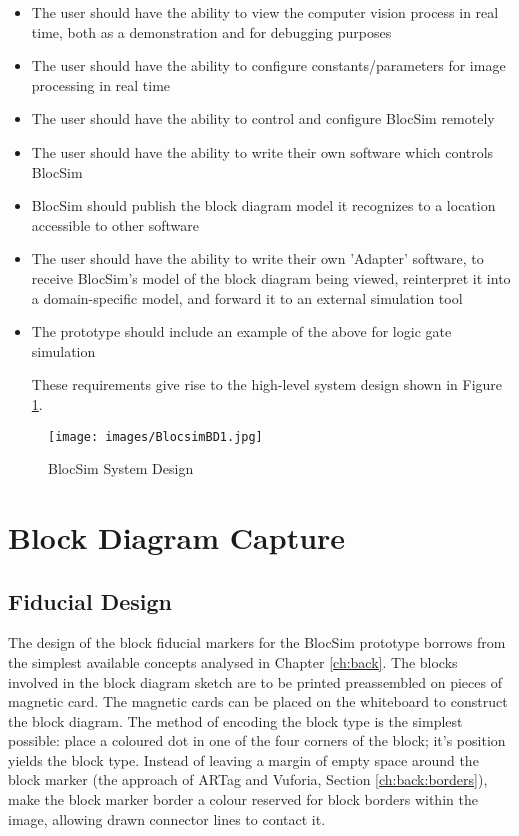 \begin{itemize}
\item The user should have the ability to view the computer vision process in real time, both as a demonstration and for debugging purposes
\item The user should have the ability to configure constants/parameters for image processing in real time
\item The user should have the ability to control and configure BlocSim remotely
\item The user should have the ability to write their own software which controls BlocSim
\item BlocSim should publish the block diagram model it recognizes to a location accessible to other software
\item The user should have the ability to write their own 'Adapter' software, to receive BlocSim's model of the block diagram being viewed, reinterpret it into a domain-specific model, and forward it to an external simulation tool
\item The prototype should include an example of the above for logic gate simulation

These requirements give rise to the high-level system design shown in Figure \ref{im:BlocsimBD1}.
\end{itemize}



\begin{figure}[ht!]
\centering
\texttt{[image: images/BlocsimBD1.jpg]}
\caption{BlocSim System Design \cite{blocsimPoster}}
\label{im:BlocsimBD1}
\end{figure}

\clearpage





\section{Block Diagram Capture}

\subsection{Fiducial Design}

The design of the block fiducial markers for the BlocSim prototype borrows from the simplest available concepts analysed in Chapter \ref{ch:back}. The blocks involved in the block diagram sketch are to be printed preassembled on pieces of magnetic card. The magnetic cards can be placed on the whiteboard to construct the block diagram. The method of encoding the block type is the simplest possible: place a coloured dot in one of the four corners of the block; it's position yields the block type. Instead of leaving a margin of empty space around the block marker (the approach of ARTag and Vuforia, Section \ref{ch:back:borders}), make the block marker border a colour reserved for block borders within the image, allowing drawn connector lines to contact it.

